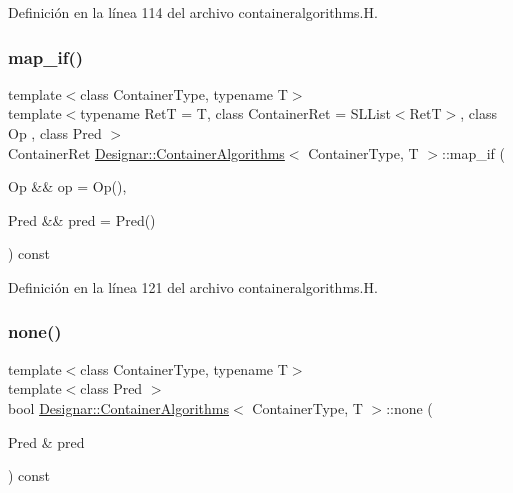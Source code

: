 Definición en la línea 114 del archivo containeralgorithms.\+H.

\mbox{\label{class_designar_1_1_container_algorithms_a23ffa9f0af79826db5a8dc04837f9617}} 
\subsubsection{\texorpdfstring{map\+\_\+if()}{map\_if()}\hspace{0.1cm}{\footnotesize\ttfamily [4/4]}}
{\footnotesize\ttfamily template$<$class Container\+Type, typename T$>$ \\
template$<$typename RetT  = T, class Container\+Ret  = S\+L\+List$<$\+Ret\+T$>$, class Op , class Pred $>$ \\
Container\+Ret \hyperlink{class_designar_1_1_container_algorithms}{Designar\+::\+Container\+Algorithms}$<$ Container\+Type, T $>$\+::map\+\_\+if (\begin{DoxyParamCaption}\item[{Op \&\&}]{op = {\ttfamily Op()},  }\item[{Pred \&\&}]{pred = {\ttfamily Pred()} }\end{DoxyParamCaption}) const\hspace{0.3cm}{\ttfamily [inline]}}



Definición en la línea 121 del archivo containeralgorithms.\+H.

\mbox{\label{class_designar_1_1_container_algorithms_aa91fe441074d132067cb5a3ad7870dc5}} 
\subsubsection{\texorpdfstring{none()}{none()}\hspace{0.1cm}{\footnotesize\ttfamily [1/2]}}
{\footnotesize\ttfamily template$<$class Container\+Type, typename T$>$ \\
template$<$class Pred $>$ \\
bool \hyperlink{class_designar_1_1_container_algorithms}{Designar\+::\+Container\+Algorithms}$<$ Container\+Type, T $>$\+::none (\begin{DoxyParamCaption}\item[{Pred \&}]{pred }\end{DoxyParamCaption}) const\hspace{0.3cm}{\ttfamily [inline]}}



